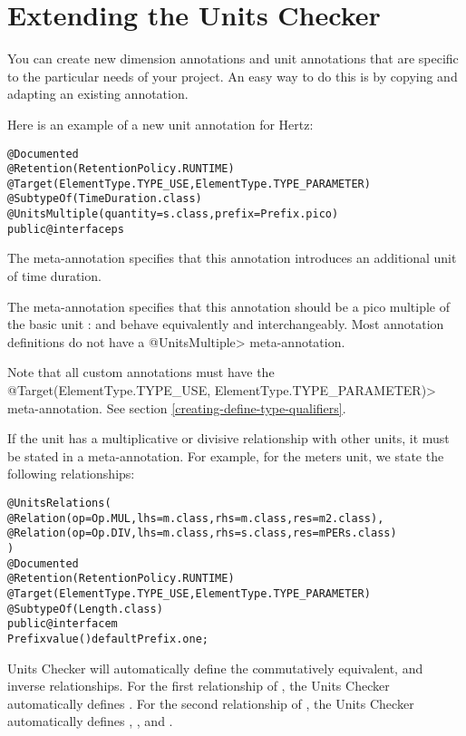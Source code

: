 \section{Extending the Units Checker\label{extending-units}}

You can create new dimension annotations and unit annotations that are specific
to the particular needs of your project. An easy way to do this is by copying
and adapting an existing annotation.

Here is an example of a new unit annotation for Hertz:

\begin{alltt}
@Documented
@Retention(RetentionPolicy.RUNTIME)
@Target(\ttlcb{}ElementType.TYPE_USE, ElementType.TYPE_PARAMETER\ttrcb{})
@SubtypeOf(\ttlcb{}TimeDuration.class\ttrcb{})
@UnitsMultiple(quantity = s.class, prefix = Prefix.pico)
public @interface ps \ttlcb{}\ttrcb{}
\end{alltt}

The  meta-annotation specifies that this annotation introduces
an additional unit of time duration.

The  meta-annotation specifies that this annotation should
be a pico multiple of the basic unit :  and
 behave equivalently and interchangeably. Most annotation
definitions do not have a \<@UnitsMultiple> meta-annotation.

Note that all custom annotations must have the
\<@Target(\ttlcb{}ElementType.TYPE\_USE, ElementType.TYPE\_PARAMETER\ttrcb{})>
meta-annotation. See section \ref{creating-define-type-qualifiers}.

If the unit has a multiplicative or divisive relationship with other units, it
must be stated in a  meta-annotation. For example, for the
meters unit, we state the following relationships:

\begin{alltt}
@UnitsRelations(\ttlcb{}
  @Relation(op = Op.MUL, lhs = m.class, rhs = m.class, res = m2.class),
  @Relation(op = Op.DIV, lhs = m.class, rhs = s.class, res = mPERs.class)
\ttrcb{})
@Documented
@Retention(RetentionPolicy.RUNTIME)
@Target(\ttlcb{}ElementType.TYPE_USE, ElementType.TYPE_PARAMETER\ttrcb{})
@SubtypeOf(Length.class)
public @interface m \ttlcb{}
    Prefix value() default Prefix.one;
\ttrcb{}
\end{alltt}

Units Checker will automatically define the commutatively equivalent, and
inverse relationships. For the first relationship of , the
Units Checker automatically defines . For the second
relationship of , the Units Checker automatically defines
, , and .


